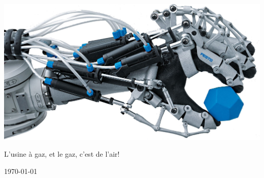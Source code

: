 \documentclass[10pt,a4paper,final]{article}
\begin{document}
\begin{center}
\begin{multicols}{2}
\begin{flushright}
\end{flushright}
\end{multicols}

\bigskip
\bigskip


\includegraphics[scale=0.6]{Figures/Picture_for_Title.jpg} 

\vfill
L'usine à gaz, et le gaz, c'est de l'air!
\bigskip

{\large \today}
\end{center}






\pagebreak
\begin{spacing}{1.5}
\tableofcontents 
\listoffigures  
\listoftables 
\end{spacing}  
\pagebreak






\renewcommand\headrulewidth{1pt}
\end{document}
